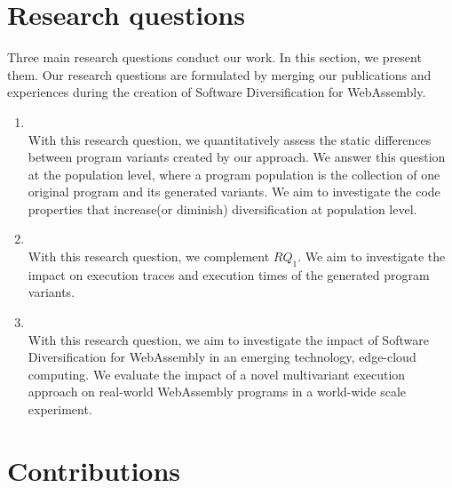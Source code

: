 \section{Research questions}
\label{intro:definition:rq}

Three main research questions conduct our work.
In this section, we present them. 
Our research questions are formulated by merging our publications and experiences during the creation of Software Diversification for WebAssembly. 


\begin{enumerate}[label=\subscript{RQ}{{\arabic*}}]
    \item \textbf{\rqone}\\
    With this research question, we quantitatively assess the static differences between program variants created by our approach. We answer this question at the population level, where a program population is the collection of one original program and its generated variants. We aim to investigate the code properties that increase(or diminish) diversification at population level. 

    \item \textbf{\rqtwo} \\
    With this research question, we complement $RQ_1$. We aim to investigate the impact on execution traces and execution times of the generated program variants.

    \item \textbf{\rqthree} \\
    With this research question, we aim to investigate the impact of Software Diversification for WebAssembly in an emerging technology, edge-cloud computing. We evaluate the impact of a novel multivariant execution approach on real-world WebAssembly programs in a world-wide scale experiment.
    
    
\end{enumerate}


\renewcommand{\rqone}{$RQ_1$. To what extent can we artificially generate program variants for WebAssembly?}

\renewcommand{\rqtwo}{$RQ_2$. To what extent are the generated variants dynamically different?}
\renewcommand{\rqthree}{$RQ_3$. To what extent do the artificial variants exhibit different execution times on edge-cloud platforms?}

\section{Contributions}

